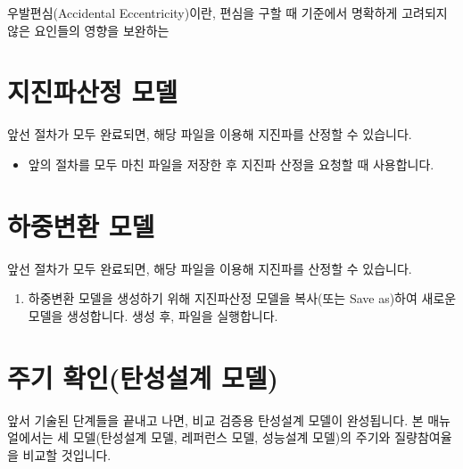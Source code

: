 \documentclass[a4paper,11pt,korean,openany,oneside]{sphinxmanual}
\begin{document}
\sphinxAtStartPar
우발편심(Accidental Eccentricity)이란, 편심을 구할 때 기준에서 명확하게 고려되지 않은 요인들의 영향을 보완하는

\sphinxstepscope


\section{지진파산정 모델}
\label{\detokenize{1_seismic_wave_request_model:id1}}\label{\detokenize{1_seismic_wave_request_model::doc}}
\sphinxAtStartPar
앞선 절차가 모두 완료되면, 해당 파일을 이용해 지진파를 산정할 수 있습니다.

\begin{sphinxShadowBox}
\begin{itemize}
\item {} 
\sphinxAtStartPar
앞의 절차를 모두 마친 파일을 저장한 후 지진파 산정을 요청할 때 사용합니다.

\end{itemize}
\end{sphinxShadowBox}

\sphinxstepscope


\section{하중변환 모델}
\label{\detokenize{1_loads_conversion_model:id1}}\label{\detokenize{1_loads_conversion_model::doc}}
\sphinxAtStartPar
앞선 절차가 모두 완료되면, 해당 파일을 이용해 지진파를 산정할 수 있습니다.

\begin{sphinxShadowBox}
\begin{enumerate}
%
\item {} 
\sphinxAtStartPar
하중변환 모델을 생성하기 위해 지진파산정 모델을 복사(또는 Save as)하여 새로운 모델을 생성합니다.
생성 후, 파일을 실행합니다.

\end{enumerate}
\end{sphinxShadowBox}

\sphinxstepscope


\section{주기 확인(탄성설계 모델)}
\label{\detokenize{1_period_check_model:id1}}\label{\detokenize{1_period_check_model::doc}}
\sphinxAtStartPar
앞서 기술된 단계들을 끝내고 나면, 비교 검증용 탄성설계 모델이 완성됩니다.
본 매뉴얼에서는 세 모델(탄성설계 모델, 레퍼런스 모델, 성능설계 모델)의 주기와 질량참여율을 비교할 것입니다.
\end{document}
